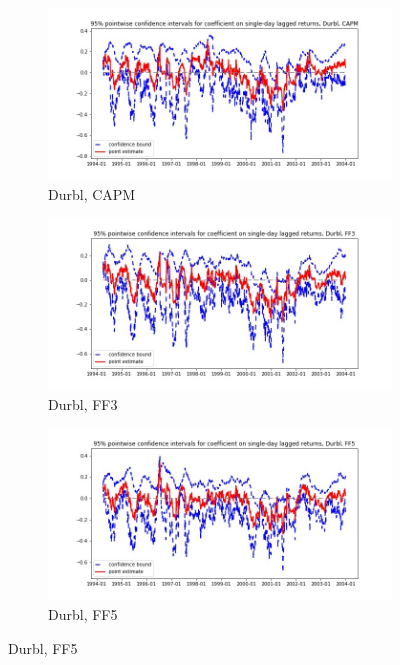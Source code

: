 \documentclass{article}
\begin{document}
\begin{landscape}

\begin{figure}
\centering
  \begin{subfigure}[b]{0.4\paperwidth}
    \includegraphics[width=\textwidth]{Durbl/bwunif_pointwiseCIs_CAPM.jpg}
    \caption{Durbl, CAPM}
    \label{fig:1}
  \end{subfigure}
  \begin{subfigure}[b]{0.4\paperwidth}
    \includegraphics[width=\textwidth]{Durbl/bwunif_pointwiseCIs_FF3.jpg}
    \caption{Durbl, FF3}
    \label{fig:2}
  \end{subfigure}
   \begin{subfigure}[b]{0.4\paperwidth}
    \includegraphics[width=\textwidth]{Durbl/bwunif_pointwiseCIs_FF5.jpg}
    \caption{Durbl, FF5}
    \label{fig:2}
  \end{subfigure}
  \end{figure}


\end{landscape}
\end{document}
